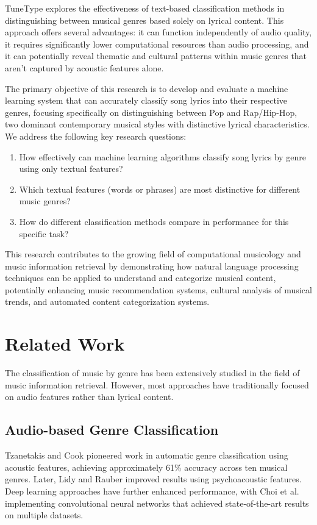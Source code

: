 \documentclass[conference]{IEEEtran}
\begin{document}
TuneType explores the effectiveness of text-based classification methods in distinguishing between musical genres based solely on lyrical content. This approach offers several advantages: it can function independently of audio quality, it requires significantly lower computational resources than audio processing, and it can potentially reveal thematic and cultural patterns within music genres that aren't captured by acoustic features alone.

The primary objective of this research is to develop and evaluate a machine learning system that can accurately classify song lyrics into their respective genres, focusing specifically on distinguishing between Pop and Rap/Hip-Hop, two dominant contemporary musical styles with distinctive lyrical characteristics. We address the following key research questions:

\begin{enumerate}
\item How effectively can machine learning algorithms classify song lyrics by genre using only textual features?
\item Which textual features (words or phrases) are most distinctive for different music genres?
\item How do different classification methods compare in performance for this specific task?
\end{enumerate}

This research contributes to the growing field of computational musicology and music information retrieval by demonstrating how natural language processing techniques can be applied to understand and categorize musical content, potentially enhancing music recommendation systems, cultural analysis of musical trends, and automated content categorization systems.

\section{Related Work}
The classification of music by genre has been extensively studied in the field of music information retrieval. However, most approaches have traditionally focused on audio features rather than lyrical content.

\subsection{Audio-based Genre Classification}
Tzanetakis and Cook \cite{tzanetakis2002musical} pioneered work in automatic genre classification using acoustic features, achieving approximately 61\% accuracy across ten musical genres. Later, Lidy and Rauber \cite{lidy2005evaluation} improved results using psychoacoustic features. Deep learning approaches have further enhanced performance, with Choi et al. \cite{choi2017convolutional} implementing convolutional neural networks that achieved state-of-the-art results on multiple datasets.
\end{document}
